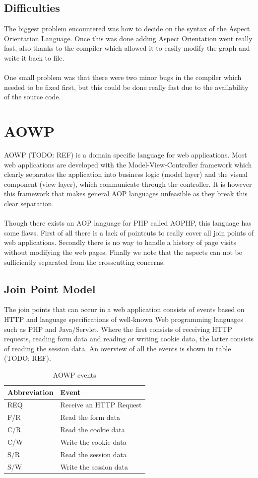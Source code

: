 \documentclass[a4paper]{report}
\begin{document}
\section{Difficulties}
The biggest problem encountered was how to decide on the syntax of the Aspect Orientation Language. Once this was done adding Aspect Orientation went really fast, also thanks to the compiler which allowed it to easily modify the graph and write it back to file.\\
\\
One small problem was that there were two minor bugs in the compiler which needed to be fixed first, but this could be done really fast due to the availability of the source code.

\chapter{AOWP}
AOWP (TODO: REF) is a domain specific language for web applications. Most web applications are developed with the Model-View-Controller framework which clearly separates the application into business logic (model layer) and the visual component (view layer), which communicate through the controller. It is however this framework that makes general AOP languages unfeasible as they break this clear separation.\\
\\
Though there exists an AOP language for PHP called AOPHP, this language has some flaws. First of all there is a lack of pointcuts to really cover all join points of web applications. Secondly there is no way to handle a history of page visits without modifying the web pages. Finally we note that the aspects can not be sufficiently separated from the crosscutting concerns.

\section{Join Point Model}
The join points that can occur in a web application consists of events based on HTTP and language specifications of well-known Web programming languages such as PHP and Java/Servlet. Where the first consists of receiving HTTP requests, reading form data and reading or writing cookie data, the latter consists of reading the session data. An overview of all the events is shown in table (TODO: REF).
\begin{table}
\centering
\begin{tabular}{l|l}
\hline
Abbreviation & Event\\
\hline
\hline
REQ & Receive an HTTP Request\\
\hline
F/R & Read the form data\\
\hline
C/R & Read the cookie data\\
\hline
C/W & Write the cookie data\\
\hline
S/R & Read the session data\\
\hline
S/W & Write the session data\\
\hline
\end{tabular}
\caption{AOWP events}
\label{tab:AOWP_Events}
\end{table}
\end{document}
